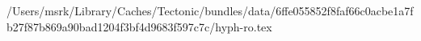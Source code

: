 /Users/msrk/Library/Caches/Tectonic/bundles/data/6ffe055852f8faf66c0acbe1a7fb27f87b869a90bad1204f3bf4d9683f597c7c/hyph-ro.tex